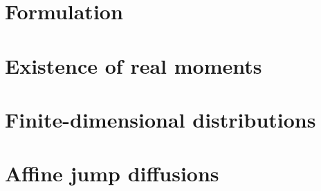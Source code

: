 \label{affine-processes:introduction}


\section{Formulation}
\label{affine-processes:formulation}


\section{Existence of real moments}
\label{affine-processes:existence}


\section{Finite-dimensional distributions}
\label{affine-processes:fdds}


\section{Affine jump diffusions}
\label{affine-processes:jump-diffusions}


